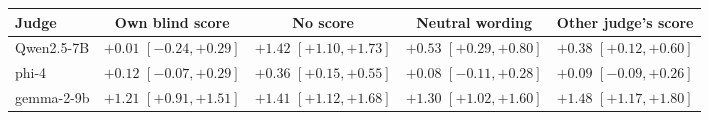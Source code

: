 \begin{tabular}{lcccc}
\toprule
Judge & Own blind score & No score & Neutral wording & Other judge's score \\
\midrule
Qwen2.5-7B & $+0.01$ {\scriptsize$[-0.24,+0.29]$} & $+1.42$ {\scriptsize$[+1.10,+1.73]$} & $+0.53$ {\scriptsize$[+0.29,+0.80]$} & $+0.38$ {\scriptsize$[+0.12,+0.60]$} \\
phi-4 & $+0.12$ {\scriptsize$[-0.07,+0.29]$} & $+0.36$ {\scriptsize$[+0.15,+0.55]$} & $+0.08$ {\scriptsize$[-0.11,+0.28]$} & $+0.09$ {\scriptsize$[-0.09,+0.26]$} \\
gemma-2-9b & $+1.21$ {\scriptsize$[+0.91,+1.51]$} & $+1.41$ {\scriptsize$[+1.12,+1.68]$} & $+1.30$ {\scriptsize$[+1.02,+1.60]$} & $+1.48$ {\scriptsize$[+1.17,+1.80]$} \\
\bottomrule
\end{tabular}
